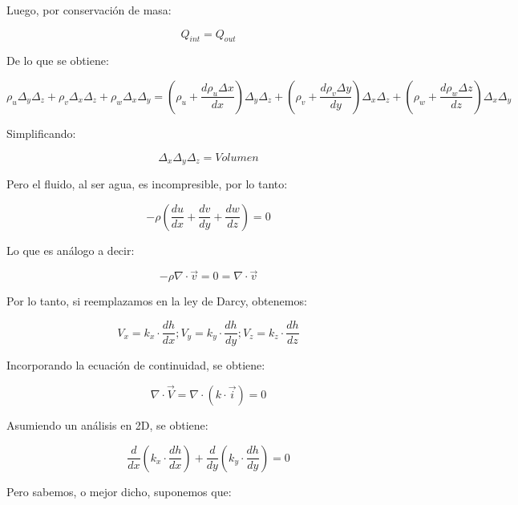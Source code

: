 Luego, por conservación de masa:

\begin{equation}
    Q_{int} = Q_{out}
\end{equation}

De lo que se obtiene:

\begin{equation}
    \rho_u \Delta_y \Delta_z + \rho_v \Delta_x \Delta_z + \rho_w \Delta_x \Delta_y = (\rho_u + \frac{d\rho_u \Delta x}{dx})\Delta_y \Delta_z + (\rho_v + \frac{d\rho_v \Delta y}{dy})\Delta_x \Delta_z + (\rho_w + \frac{d\rho_w \Delta z}{dz})\Delta_x \Delta_y
\end{equation}

Simplificando:

\begin{equation}
    \Delta_x \Delta_y \Delta_z = Volumen
\end{equation}

Pero el fluido, al ser agua, es incompresible, por lo tanto:

\begin{equation}
   -\rho(\frac{du}{dx}+ \frac{dv}{dy}+ \frac{dw}{dz}) = 0
\end{equation}

Lo que es análogo a decir:

\begin{equation}
    -\rho \nabla \cdot \vec{v} = 0 = \nabla \cdot \vec{v}
\end{equation}

Por lo tanto, si reemplazamos en la ley de Darcy, obtenemos:

\begin{equation}
    V_x = k_x\cdot \frac{dh}{dx}; V_y = k_y\cdot \frac{dh}{dy}; V_z = k_z\cdot \frac{dh}{dz}
\end{equation}

Incorporando la ecuación de continuidad, se obtiene:

\begin{equation}
    \nabla \cdot \vec{V} = \nabla \cdot (k \cdot \vec{i}) = 0
\end{equation}

Asumiendo un análisis en 2D, se obtiene:

\begin{equation}
    \frac{d}{dx}(k_x \cdot \frac{dh}{dx}) + \frac{d}{dy}(k_y \cdot \frac{dh}{dy}) = 0
\end{equation}

Pero sabemos, o mejor dicho, suponemos que:

